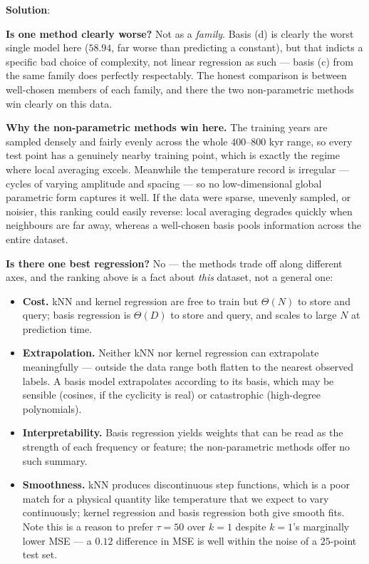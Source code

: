 \documentclass[submit]{../harvardml}
\newenvironment{solution}{
    \vspace{2mm}
    \color{blue}\noindent\textbf{Solution}:
}{}
\begin{document}
\begin{solution}
\begin{enumerate}
\textbf{Is one method clearly worse?} Not as a \emph{family}. Basis (d) is
clearly the worst single model here ($58.94$, far worse than predicting a
constant), but that indicts a specific bad choice of complexity, not linear
regression as such --- basis (c) from the same family does perfectly
respectably. The honest comparison is between well-chosen members of each
family, and there the two non-parametric methods win clearly on this data.

\textbf{Why the non-parametric methods win here.} The training years are
sampled densely and fairly evenly across the whole $400$--$800$ kyr range, so
every test point has a genuinely nearby training point, which is exactly the
regime where local averaging excels. Meanwhile the temperature record is
irregular --- cycles of varying amplitude and spacing --- so no low-dimensional
global parametric form captures it well. If the data were sparse, unevenly
sampled, or noisier, this ranking could easily reverse: local averaging degrades
quickly when neighbours are far away, whereas a well-chosen basis pools
information across the entire dataset.

\textbf{Is there one best regression?} No --- the methods trade off along
different axes, and the ranking above is a fact about \emph{this} dataset, not a
general one:
\begin{itemize}
  \item \textbf{Cost.} kNN and kernel regression are free to train but
    $\Theta(N)$ to store and query; basis regression is $\Theta(D)$ to store and
    query, and scales to large $N$ at prediction time.
  \item \textbf{Extrapolation.} Neither kNN nor kernel regression can
    extrapolate meaningfully --- outside the data range both flatten to the
    nearest observed labels. A basis model extrapolates according to its basis,
    which may be sensible (cosines, if the cyclicity is real) or catastrophic
    (high-degree polynomials).
  \item \textbf{Interpretability.} Basis regression yields weights that can be
    read as the strength of each frequency or feature; the non-parametric
    methods offer no such summary.
  \item \textbf{Smoothness.} kNN produces discontinuous step functions, which
    is a poor match for a physical quantity like temperature that we expect to
    vary continuously; kernel regression and basis regression both give smooth
    fits. Note this is a reason to prefer $\tau = 50$ over $k = 1$ despite
    $k=1$'s marginally lower MSE --- a $0.12$ difference in MSE is well within
    the noise of a $25$-point test set.
\end{itemize}


\end{enumerate}
\end{solution}
\end{document}
